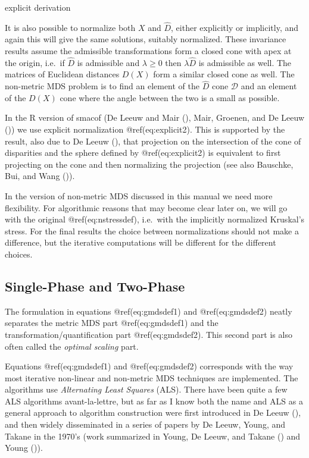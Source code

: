 \documentclass[
  12pt,
  letterpaper,
  DIV=11,
  numbers=noendperiod]{scrartcl}
\theoremstyle{plain}
\theoremstyle{remark}
\begin{document}
explicit derivation

It is also possible to normalize both \(X\) and \(\hat D\), either
explicitly or implicitly, and again this will give the same solutions,
suitably normalized. These invariance results assume the admissible
transformations form a closed cone with apex at the origin, i.e.~if
\(\hat D\) is admissible and \(\lambda\geq 0\) then \(\lambda\hat D\) is
admissible as well. The matrices of Euclidean distances \(D(X)\) form a
similar closed cone as well. The non-metric MDS problem is to find an
element of the \(\hat D\) cone \(\mathcal{D}\) and an element of the
\(D(X)\) cone where the angle between the two is a small as possible.

In the R version of smacof (De Leeuw and Mair
(), Mair, Groenen, and De Leeuw
()) we use explicit
normalization @ref(eq:explicit2). This is supported by the result, also
due to De Leeuw (), that projection on
the intersection of the cone of disparities and the sphere defined by
@ref(eq:explicit2) is equivalent to first projecting on the cone and
then normalizing the projection (see also Bauschke, Bui, and Wang
()).

In the version of non-metric MDS discussed in this manual we need more
flexibility. For algorithmic reasons that may become clear later on, we
will go with the original @ref(eq:nstressdef), i.e.~with the implicitly
normalized Kruskal's stress. For the final results the choice between
normalizations should not make a difference, but the iterative
computations will be different for the different choices.

\subsection{Single-Phase and
Two-Phase}\label{single-phase-and-two-phase}

The formulation in equations @ref(eq:gmdsdef1) and @ref(eq:gmdsdef2)
neatly separates the metric MDS part @ref(eq:gmdsdef1) and the
transformation/quantification part @ref(eq:gmdsdef2). This second part
is also often called the \emph{optimal scaling} part.

Equations @ref(eq:gmdsdef1) and @ref(eq:gmdsdef2) corresponds with the
way most iterative non-linear and non-metric MDS techniques are
implemented. The algorithms use \emph{Alternating Least Squares} (ALS).
There have been quite a few ALS algorithms avant-la-lettre, but as far
as I know both the name and ALS as a general approach to algorithm
construction were first introduced in De Leeuw
(), and then widely disseminated in a
series of papers by De Leeuw, Young, and Takane in the 1970's (work
summarized in Young, De Leeuw, and Takane
() and Young
()).
\end{document}
